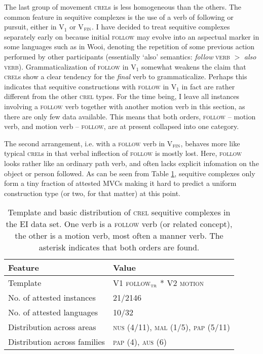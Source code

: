 The last group of movement \textsc{crel}s is less homogeneous than the others. The common feature in sequitive complexes is the use of a verb of following or pursuit, either in V$_{1}$ or V$_{\textsc{fin}}$. I have decided to treat sequitive complexes separately early on because initial \textsc{follow} may evolve into an aspectual marker in some languages such as in Wooi, denoting the repetition of some previous action performed by other participants (essentially `also' semantics: \textit{follow} \textsc{verb} $>$ \textit{also} \textsc{verb}). Grammaticalization of \textsc{follow} in V$_{1}$ somewhat weakens the claim that \textsc{crel}s show a clear tendency for the \emph{final} verb to grammaticalize. Perhaps this indicates that sequitive constructions with \textsc{follow} in V$_{1}$ in fact are rather different from the other \textsc{crel} types. For the time being, I leave all instances involving a \textsc{follow} verb together with another motion verb in this section, as there are only few data available. This means that both orders, \textsc{follow} -- motion verb, and motion verb -- \textsc{follow}, are at present collapsed into one category.

The second arrangement, i.e. with a \textsc{follow} verb in V$_{\textsc{fin}}$, behaves more like typical \textsc{crel}s in that verbal inflection of \textsc{follow} is mostly lost. Here, \textsc{follow} looks rather like an ordinary path verb, and often lacks explicit infomation on the object or person followed. As can be seen from Table \ref{table:basiccrelseq}, sequitive complexes only form a tiny fraction of attested MVCs making it hard to predict a uniform construction type (or two, for that matter) at this point.

\begin{table}


\begin{tabular}{ll}
\lsptoprule
Feature&Value\tabularnewline
\hline
Template&V1 \textsc{follow$_{\textsc{tr}}$} * V2 \textsc{motion}\tabularnewline
No. of attested instances& 21/2146 \tabularnewline
No. of attested languages& 10/32 \tabularnewline
Distribution across areas& \textsc{nus} (4/11), \textsc{mal} (1/5), \textsc{pap} (5/11) \tabularnewline
Distribution across families& \textsc{pap} (4), \textsc{aus} (6) \tabularnewline
\hline
\end{tabular}
\caption[Template and basic distribution of \textsc{crel} sequitive complexes]{Template and basic distribution of \textsc{crel} sequitive complexes in the EI data set. One verb is a \textsc{follow} verb (or related concept), the other is a motion verb, most often a manner verb. The asterisk indicates that both orders are found.}
\label{table:basiccrelseq}
\end{table}


